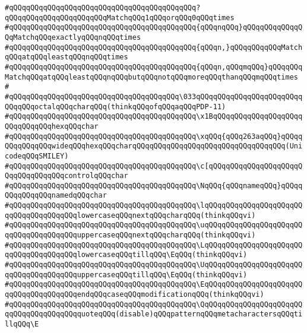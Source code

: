 \verb|#qQQqqQQqqQQqqQQqqQQqqQQqqQQqqQQqqQQqqQQqqQQq?qQQqqQQqqQQqqQQqqQQqqQQqMatchqQQq1qQQqorqQQq0qQQqtimes|\newline
\verb|#qQQqqQQqqQQqqQQqqQQqqQQqqQQqqQQqqQQqqQQqqQQq{qQQqnqQQq}qQQqqQQqqQQqqQQqMatchqQQqexactlyqQQqnqQQqtimes|\newline
\verb|#qQQqqQQqqQQqqQQqqQQqqQQqqQQqqQQqqQQqqQQqqQQq{qQQqn,}qQQqqQQqqQQqMatchqQQqatqQQqleastqQQqnqQQqtimes|\newline
\verb|#qQQqqQQqqQQqqQQqqQQqqQQqqQQqqQQqqQQqqQQqqQQq{qQQqn,qQQqmqQQq}qQQqqQQqMatchqQQqatqQQqleastqQQqnqQQqbutqQQqnotqQQqmoreqQQqthanqQQqmqQQqtimes|\newline
\verb|#|\newline
\verb|#qQQqqQQqqQQqqQQqqQQqqQQqqQQqqQQqqQQqqQQq\033qQQqqQQqqQQqqQQqqQQqqQQqqQQqqQQqoctalqQQqcharqQQq(thinkqQQqofqQQqaqQQqPDP-11)|\newline
\verb|#qQQqqQQqqQQqqQQqqQQqqQQqqQQqqQQqqQQqqQQqqQQq\x1BqQQqqQQqqQQqqQQqqQQqqQQqqQQqqQQqhexqQQqchar|\newline
\verb|#qQQqqQQqqQQqqQQqqQQqqQQqqQQqqQQqqQQqqQQqqQQq\xqQQq{qQQq263aqQQq}qQQqqQQqqQQqqQQqwideqQQqhexqQQqcharqQQqqQQqqQQqqQQqqQQqqQQqqQQqqQQqqQQq(UnicodeqQQqSMILEY)|\newline
\verb|#qQQqqQQqqQQqqQQqqQQqqQQqqQQqqQQqqQQqqQQqqQQq\c[qQQqqQQqqQQqqQQqqQQqqQQqqQQqqQQqqQQqcontrolqQQqchar|\newline
\verb|#qQQqqQQqqQQqqQQqqQQqqQQqqQQqqQQqqQQqqQQqqQQq\NqQQq{qQQqnameqQQq}qQQqqQQqqQQqqQQqnamedqQQqchar|\newline
\verb|#qQQqqQQqqQQqqQQqqQQqqQQqqQQqqQQqqQQqqQQqqQQq\lqQQqqQQqqQQqqQQqqQQqqQQqqQQqqQQqqQQqqQQqlowercaseqQQqnextqQQqcharqQQq(thinkqQQqvi)|\newline
\verb|#qQQqqQQqqQQqqQQqqQQqqQQqqQQqqQQqqQQqqQQqqQQq\uqQQqqQQqqQQqqQQqqQQqqQQqqQQqqQQqqQQqqQQquppercaseqQQqnextqQQqcharqQQq(thinkqQQqvi)|\newline
\verb|#qQQqqQQqqQQqqQQqqQQqqQQqqQQqqQQqqQQqqQQqqQQq\LqQQqqQQqqQQqqQQqqQQqqQQqqQQqqQQqqQQqqQQqlowercaseqQQqtillqQQq\EqQQq(thinkqQQqvi)|\newline
\verb|#qQQqqQQqqQQqqQQqqQQqqQQqqQQqqQQqqQQqqQQqqQQq\UqQQqqQQqqQQqqQQqqQQqqQQqqQQqqQQqqQQqqQQquppercaseqQQqtillqQQq\EqQQq(thinkqQQqvi)|\newline
\verb|#qQQqqQQqqQQqqQQqqQQqqQQqqQQqqQQqqQQqqQQqqQQq\EqQQqqQQqqQQqqQQqqQQqqQQqqQQqqQQqqQQqqQQqendqQQqcaseqQQqmodificationqQQq(thinkqQQqvi)|\newline
\verb|#qQQqqQQqqQQqqQQqqQQqqQQqqQQqqQQqqQQqqQQqqQQq\QqQQqqQQqqQQqqQQqqQQqqQQqqQQqqQQqqQQqqQQqquoteqQQq(disable)qQQqpatternqQQqmetacharactersqQQqtillqQQq\E|\newline
